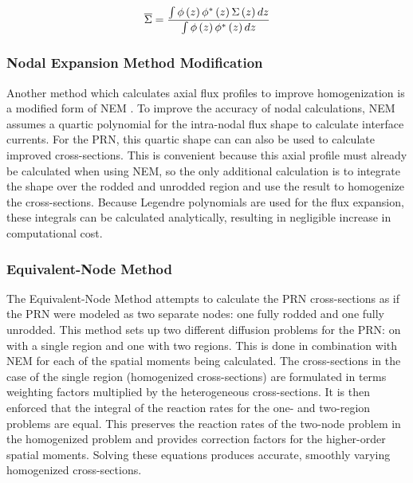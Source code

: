 \begin{equation}\label{e:bilinearWeighting}
\overline{\Sigma} = \frac{\intop \phi\left(z\right) \phi^*\left(z\right) \Sigma\left(z\right) dz}{\intop \phi\left(z\right) \phi^*\left(z\right) dz}
\end{equation}

\subsubsection{Nodal Expansion Method Modification}\label{sss:NEMmod}

Another method which calculates axial flux profiles to improve homogenization is a modified form of NEM \cite{de2012NEMmodification,martinez1999NEMmodOrig}.  To improve the accuracy of nodal calculations, NEM assumes a quartic polynomial for the intra-nodal flux shape to calculate interface currents.  For the PRN, this quartic shape can can also be used to calculate improved cross-sections.  This is convenient because this axial profile must already be calculated when using NEM, so the only additional calculation is to integrate the shape over the rodded and unrodded region and use the result to homogenize the cross-sections.  Because Legendre polynomials are used for the flux expansion, these integrals can be calculated analytically, resulting in negligible increase in computational cost.

\subsubsection{Equivalent-Node Method}

The Equivalent-Node Method \cite{dall2002nodeEquivalenceDecusping} attempts to calculate the PRN cross-sections as if the PRN were modeled as two separate nodes: one fully rodded and one fully unrodded.  This method sets up two different diffusion problems for the PRN: on with a single region and one with two regions.  This is done in combination with NEM for each of the spatial moments being calculated.  The cross-sections in the case of the single region (homogenized cross-sections) are formulated in terms weighting factors multiplied by the heterogeneous cross-sections.  It is then enforced that the integral of the reaction rates for the one- and two-region problems are equal.  This preserves the reaction rates of the two-node problem in the homogenized problem and provides correction factors for the higher-order spatial moments.  Solving these equations produces accurate, smoothly varying homogenized cross-sections.

